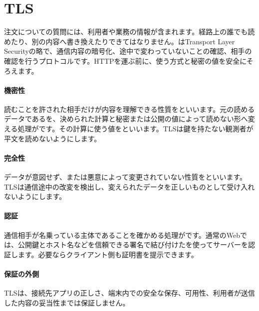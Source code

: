 \par
\endgroup
\par
\endgroup


\section{TLS}
\label{sec:05-network-16}

注文についての質問には、利用者や業務の情報が含まれます。経路上の誰でも読めたり、別の内容へ書き換えたりできてはなりません。はTransport Layer Securityの略で、通信内容の暗号化、途中で変わっていないことの確認、相手の確認を行うプロトコルです。HTTPを運ぶ前に、使う方式と秘密の値を安全にそろえます。

\begingroup
\begingroup
\paragraph{機密性}
        読むことを許された相手だけが内容を理解できる性質をといいます。元の読めるデータであるを、決められた計算と秘密または公開の値によって読めない形へ変える処理がです。その計算に使う値をといいます。TLSは鍵を持たない観測者が平文を読めないようにします。

\par
\endgroup
\medskip
\begingroup
\paragraph{完全性}
        データが意図せず、または悪意によって変更されていない性質をといいます。TLSは通信途中の改変を検出し、変えられたデータを正しいものとして受け入れないようにします。

\par
\endgroup
\medskip
\begingroup
\paragraph{認証}
        通信相手が名乗っている主体であることを確かめる処理がです。通常のWebでは、公開鍵とホスト名などを信頼できる署名で結び付けたを使ってサーバーを認証します。必要ならクライアント側も証明書を提示できます。

\par
\endgroup
  \vspace{5mm}
\paragraph{保証の外側}
    TLSは、接続先アプリの正しさ、端末内での安全な保存、可用性、利用者が送信した内容の妥当性までは保証しません。

